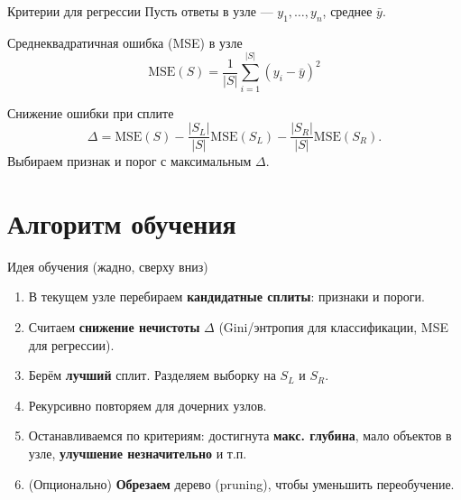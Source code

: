 \documentclass[12pt]{beamer}
\begin{document}
\begin{frame}{Критерии для регрессии}
	Пусть ответы в узле — $y_1,\dots,y_n$, среднее $\bar y$.
	\begin{block}{Среднеквадратичная ошибка (MSE) в узле}
		\[
			\mathrm{MSE}(S) = \frac{1}{|S|}\sum_{i=1}^{|S|} (y_i - \bar y)^2
		\]
	\end{block}
	\begin{block}{Снижение ошибки при сплите}
		\[
			\Delta = \mathrm{MSE}(S) - \frac{|S_L|}{|S|}\mathrm{MSE}(S_L) - \frac{|S_R|}{|S|}\mathrm{MSE}(S_R).
		\]
		Выбираем признак и порог с максимальным $\Delta$.
	\end{block}
\end{frame}

\section{Алгоритм обучения}

\begin{frame}{Идея обучения (жадно, сверху вниз)}
	\begin{enumerate}
		\item В текущем узле перебираем \textbf{кандидатные сплиты}: признаки и пороги.
		\item Считаем \textbf{снижение нечистоты} $\Delta$ (Gini/энтропия для классификации, MSE для регрессии).
		\item Берём \textbf{лучший} сплит. Разделяем выборку на $S_L$ и $S_R$.
		\item Рекурсивно повторяем для дочерних узлов.
		\item Останавливаемся по критериям: достигнута \textbf{макс. глубина}, мало объектов в узле, \textbf{улучшение незначительно} и т.п.
		\item (Опционально) \textbf{Обрезаем} дерево (pruning), чтобы уменьшить переобучение.
	\end{enumerate}
\end{frame}
\end{document}
